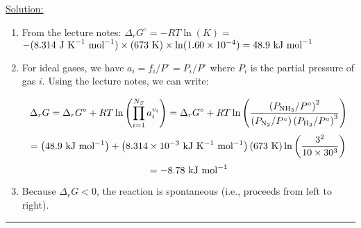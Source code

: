 \noindent
\underline{Solution:}

\begin{enumerate}
\item From the lecture notes: $\Delta_rG^\circ = -RT\ln(K) =$ $-(8.314\textnormal{ J K}^{-1}\textnormal{ mol}^{-1})\times (673\textnormal{ K})\times\ln(1.60\times 10^{-4}) = 48.9\textnormal{ kJ mol}^{-1}$
\item For ideal gases, we have $a_i = f_i / P^\circ = P_i / P^\circ$ where $P_i$ is the partial pressure of gas $i$. Using the lecture notes, we can write:

$$\Delta_rG = \Delta_rG^\circ + RT\ln\left(\prod\limits_{i=1}^{N_S}a_i^{v_i}\right) = \Delta_r G^\circ + RT\ln\left(\frac{\left(P_{\textnormal{NH}_3} / P^\circ\right)^2}{\left(P_{\textnormal{N}_2}/P^\circ\right)\left(P_{\textnormal{H}_2}/P^\circ\right)^3}\right)$$
$$= \left(48.9\textnormal{ kJ mol}^{-1}\right) + \left(8.314\times 10^{-3}\textnormal{ kJ K}^{-1}\textnormal{ mol}^{-1}\right)\left(673\textnormal{ K}\right)\ln\left(\frac{3^2}{10\times 30^3}\right)$$
$$ = -8.78\textnormal{ kJ mol}^{-1}$$

\item Because $\Delta_r G < 0$, the reaction is spontaneous (i.e., proceeds from left to right).
\end{enumerate}
\hrule\vspace{0.5cm}
